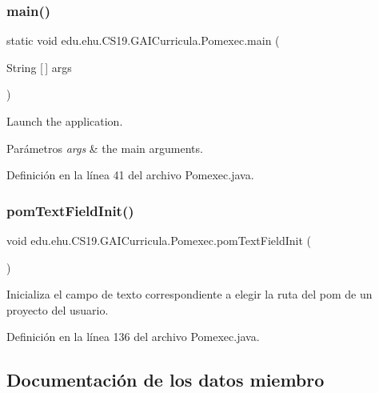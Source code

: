 \subsubsection{\texorpdfstring{main()}{main()}}
{\footnotesize\ttfamily static void edu.\+ehu.\+C\+S19.\+G\+A\+I\+Curricula.\+Pomexec.\+main (\begin{DoxyParamCaption}\item[{String \mbox{[}$\,$\mbox{]}}]{args }\end{DoxyParamCaption})\hspace{0.3cm}{\ttfamily [static]}}



Launch the application. 


\begin{DoxyParams}{Parámetros}
{\em args} & the main arguments. \\
\hline
\end{DoxyParams}


Definición en la línea 41 del archivo Pomexec.\+java.

\mbox{\label{a00028_a99d8b8d9e55a300b5ce6f7cc7d546a26}} 
\subsubsection{\texorpdfstring{pomTextFieldInit()}{pomTextFieldInit()}}
{\footnotesize\ttfamily void edu.\+ehu.\+C\+S19.\+G\+A\+I\+Curricula.\+Pomexec.\+pom\+Text\+Field\+Init (\begin{DoxyParamCaption}{ }\end{DoxyParamCaption})}



Inicializa el campo de texto correspondiente a elegir la ruta del pom de un proyecto del usuario. 



Definición en la línea 136 del archivo Pomexec.\+java.



\subsection{Documentación de los datos miembro}
\mbox{\label{a00028_ac458a48643144b5728bb22fdace1dada}} 
